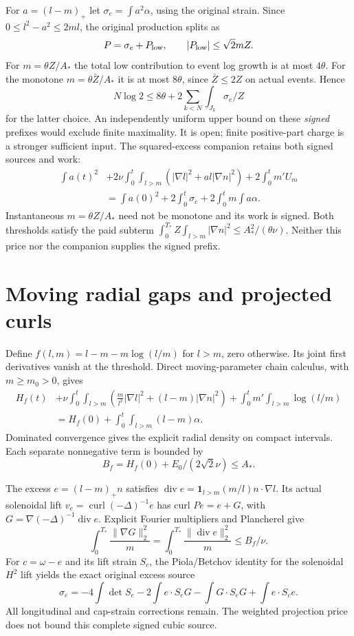 \documentclass[11pt]{article}
\begin{document}
For $a=(l-m)_+$ let $\sigma_e=\int a^2\alpha$, using the original strain.
Since $0\le l^2-a^2\le2ml$, the original production splits as
\[
 P=\sigma_e+P_{\rm low},\qquad |P_{\rm low}|\le\sqrt2mZ.
\]
For $m=\theta Z/A_*$ the total low contribution to event log growth is
at most $4\theta$. For the monotone $m=\theta\bar Z/A_*$ it is at most
$8\theta$, since $\bar Z\le2Z$ on actual events. Hence
\[
 N\log2\le8\theta+2\sum_{k<N}\int_{J_k}\sigma_e/Z
\]
for the latter choice. An independently uniform upper bound on these
\emph{signed} prefixes would exclude finite maximality. It is open;
finite positive-part charge is a stronger sufficient input.
The squared-excess companion retains both signed sources and work:
\begin{align*}
 \int a(t)^2&+2\nu\int_0^t\!\int_{l>m}
 (|\nabla l|^2+al|\nabla n|^2)+2\int_0^tm'U_m\\
 &=\int a(0)^2+2\int_0^t\sigma_e+2\int_0^tm\int a\alpha.
\end{align*}
Instantaneous $m=\theta Z/A_*$ need not be monotone and its work is signed.
Both thresholds satisfy the paid subterm
$\int_0^{T_*}Z\int_{l>m}|\nabla n|^2\le A_*^2/(\theta\nu)$.
Neither this price nor the companion supplies the signed prefix.

\section{Moving radial gaps and projected curls}
Define $f(l,m)=l-m-m\log(l/m)$ for $l>m$, zero otherwise.
Its joint first derivatives vanish at the threshold. Direct moving-parameter
chain calculus, with $m\ge m_0>0$, gives
\begin{align*}
 H_f(t)&+\nu\int_0^t\!\int_{l>m}
 \left(\frac m{l^2}|\nabla l|^2+(l-m)|\nabla n|^2\right)
 +\int_0^tm'\int_{l>m}\log(l/m)\\
 &=H_f(0)+\int_0^t\!\int_{l>m}(l-m)\alpha.
\end{align*}
Dominated convergence gives the explicit radial density on compact intervals.
Each separate nonnegative term is bounded by
\[
 B_f=H_f(0)+E_0/(2\sqrt2\nu)\le A_*.
\]

The excess $e=(l-m)_+n$ satisfies
$\operatorname{div}e=\mathbf1_{l>m}(m/l)n\cdot\nabla l$.
Its actual solenoidal lift $v_e=\operatorname{curl}(-\Delta)^{-1}e$
has curl $Pe=e+G$, with $G=\nabla(-\Delta)^{-1}\operatorname{div}e$.
Explicit Fourier multipliers and Plancherel give
\[
 \int_0^{T_*}\frac{\|\nabla G\|_2^2}{m}
 =\int_0^{T_*}\frac{\|\operatorname{div}e\|_2^2}{m}
 \le B_f/\nu.
\]
For $c=\omega-e$ and its lift strain $S_c$, the Piola/Betchov identity
for the solenoidal $H^2$ lift yields the exact original excess source
\[
 \sigma_e=-4\int\det S_e-2\int e\cdot S_eG
                      -\int G\cdot S_eG+\int e\cdot S_ce.
\]
All longitudinal and cap-strain corrections remain. The weighted
projection price does not bound this complete signed cubic source.
\end{document}
